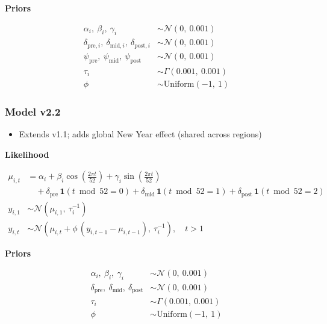 \documentclass[
]{article}
\providecommand{\tightlist}{%
  \setlength{\itemsep}{0pt}\setlength{\parskip}{0pt}}
\begin{document}
\textbf{Priors}

\[
\begin{aligned}
\alpha_i,\ \beta_i,\ \gamma_i &\sim \mathcal{N}(0,\ 0.001) \\[4pt]
\delta_{\text{pre},i},\ \delta_{\text{mid},i},\ \delta_{\text{post},i} &\sim \mathcal{N}(0,\ 0.001) \\[4pt]
\psi_{\text{pre}},\ \psi_{\text{mid}},\ \psi_{\text{post}} &\sim \mathcal{N}(0,\ 0.001) \\[4pt]
\tau_i &\sim \Gamma(0.001,\ 0.001) \\[4pt]
\phi   &\sim \mathrm{Uniform}(-1,\ 1)
\end{aligned}
\]

\subsubsection*{Model v2.2}\label{model-v2.2}

\begin{itemize}
\tightlist
\item
  Extends v1.1; adds global New Year effect (shared across regions)
\end{itemize}

\textbf{Likelihood}

\[
\begin{aligned}
\mu_{i,t} &= \alpha_i
              + \beta_i \cos\!\left(\tfrac{2\pi t}{52}\right)
              + \gamma_i \sin\!\left(\tfrac{2\pi t}{52}\right) \\[4pt]
           &\quad + \delta_{\text{pre}}\,\mathbf{1}(t \bmod 52 = 0)
              + \delta_{\text{mid}}\,\mathbf{1}(t \bmod 52 = 1)
              + \delta_{\text{post}}\,\mathbf{1}(t \bmod 52 = 2) \\[4pt]
y_{i,1} &\sim \mathcal{N}(\mu_{i,1},\ \tau_i^{-1}) \\[4pt]
y_{i,t} &\sim \mathcal{N}\!\left(\mu_{i,t} + \phi\,(y_{i,t-1} - \mu_{i,t-1}),\ \tau_i^{-1}\right), \quad t > 1
\end{aligned}
\]

\textbf{Priors}

\[
\begin{aligned}
\alpha_i,\ \beta_i,\ \gamma_i &\sim \mathcal{N}(0,\ 0.001) \\[4pt]
\delta_{\text{pre}},\ \delta_{\text{mid}},\ \delta_{\text{post}} &\sim \mathcal{N}(0,\ 0.001) \\[4pt]
\tau_i &\sim \Gamma(0.001,\ 0.001) \\[4pt]
\phi   &\sim \mathrm{Uniform}(-1,\ 1)
\end{aligned}
\]
\end{document}
